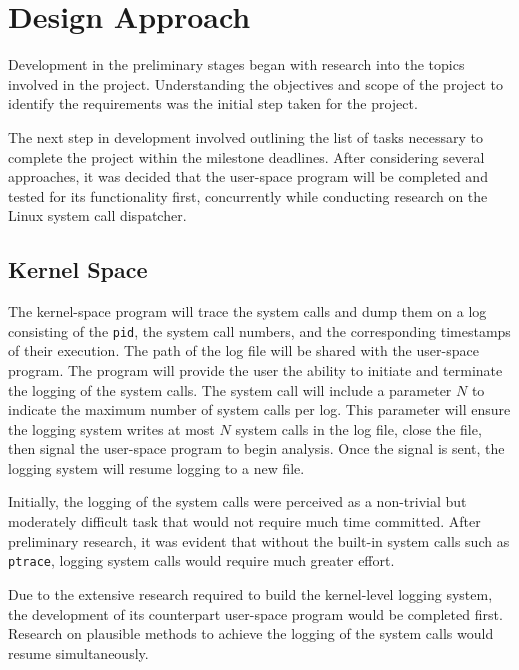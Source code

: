 \documentclass[paper=usletter, fontsize=12pt]{article}
\begin{document}

    

    \section{Design Approach} Development in the preliminary stages began with
    research into the topics involved in the project. Understanding the
    objectives and scope of the project to identify the requirements was the
    initial step taken for the project.

    The next step in development involved outlining the list of tasks necessary
    to complete the project within the milestone deadlines. After considering
    several approaches, it was decided that the user-space program will be
    completed and tested for its functionality first, concurrently while
    conducting research on the Linux system call dispatcher.

    \subsection{Kernel Space} The kernel-space program will trace the system
    calls and dump them on a log consisting of the \texttt{pid}, the system
    call numbers, and the corresponding timestamps of their execution. The path
    of the log file will be shared with the user-space program. The program
    will provide the user the ability to initiate and terminate the logging of
    the system calls. The system call will include a parameter $N$ to indicate
    the maximum number of system calls per log. This parameter will ensure the
    logging system writes at most $N$ system calls in the log file, close the
    file, then signal the user-space program to begin analysis. Once the signal
    is sent, the logging system will resume logging to a new file.

    Initially, the logging of the system calls were perceived as a non-trivial
    but moderately difficult task that would not require much time committed.
    After preliminary research, it was evident that without the built-in system
    calls such as \texttt{ptrace}, logging system calls would require much
    greater effort.

    Due to the extensive research required to build the kernel-level logging
    system, the development of its counterpart user-space program would be
    completed first. Research on plausible methods to achieve the logging of
    the system calls would resume simultaneously.
\end{document}
